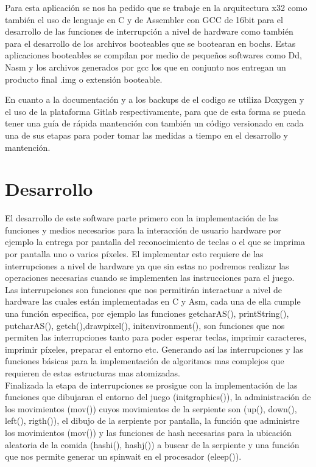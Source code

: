 \documentclass[twocolumn,11pts]{IEEEtran}
\begin{document}
    Para esta aplicación se nos ha pedido que se trabaje en la arquitectura x32 como también el uso de lenguaje en C y de Assembler\cite{asm} con GCC\cite{gcc} de 16bit para el desarrollo de las funciones de interrupción a nivel de hardware como también para el desarrollo de los archivos booteables que se bootearan en bochs. Estas aplicaciones booteables se compilan por medio de pequeños softwares como Dd\cite{dd}, Nasm\cite{nasm} y los archivos generados por gcc los que en conjunto nos entregan un producto final .img o extensión booteable.
    
    En cuanto a la documentación y a los backups de el codigo se utiliza Doxygen\cite{doxy} y el uso de la plataforma Gitlab\cite{git} respectivamente, para que de esta forma se pueda tener una guía de rápida mantención con también un código versionado en cada una de sus etapas para poder tomar las medidas a tiempo en el desarrollo y mantención.
    
    
    

\section{Desarrollo}
    El desarrollo de este software parte primero con la implementación de las funciones y medios necesarios para la interacción de usuario hardware por ejemplo la entrega por pantalla del reconocimiento de teclas o el que se imprima por pantalla uno o varios píxeles. El implementar esto requiere de las interrupciones a nivel de hardware ya que sin estas no podremos realizar las operaciones necesarias cuando se implementen las instrucciones para el juego. 
   \\
    
    Las interrupciones son funciones que nos permitirán interactuar a nivel de hardware las cuales están implementadas en C y Asm, cada una de ella cumple una función especifica, por ejemplo las funciones getcharAS(), printString(), putcharAS(), getch(),drawpixel(), initenvironment(), son funciones que nos permiten las interrupciones tanto para poder esperar teclas, imprimir caracteres, imprimir píxeles, preparar el entorno etc. Generando así las interrupciones y las funciones básicas para la implementación de algoritmos mas complejos que requieren de estas estructuras mas atomizadas.
   \\
   
    Finalizada la etapa de interrupciones se prosigue con la implementación de las funciones que dibujaran el entorno del juego (initgraphics()), la administración de los movimientos (mov()) cuyos movimientos de la serpiente son (up(), down(), left(), rigth()), el dibujo de la serpiente por pantalla, la función que administre los movimientos (mov()) y las funciones de hash necesarias para la ubicación aleatoria de la comida (hashi(), hashj()) a buscar de la serpiente y una función que nos permite generar un spinwait en el procesador (eleep()).
   \\
   
\end{document}
